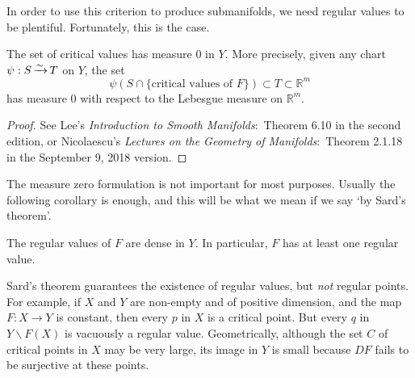 \documentclass[a4paper,11pt]{article}
\begin{document}
	In order to use this criterion to produce submanifolds, we need regular values to be plentiful. Fortunately, this is the case.

	\begin{thm}
		The set of critical values has measure 0 in $Y$. More precisely, given any chart $\psi: S \operatorname{\xrightarrow{\sim}} T$ on $Y$, the set
		\[
			\psi(S \cap \{\text{critical values of }F\}) \subset T \subset \mathbb{R}^m
		\]
		has measure 0 with respect to the Lebesgue measure on $\mathbb{R}^m$.
	\end{thm}
	\begin{proof}
		See Lee's \emph{Introduction to Smooth Manifolds}:\ Theorem 6.10 in the second edition, or Nicolaescu's \emph{Lectures on the Geometry of Manifolds}:\ Theorem 2.1.18 in the September 9, 2018 version.
	\end{proof}

	The measure zero formulation is not important for most purposes. Usually the following corollary is enough, and this will be what we mean if we say `by Sard's theorem'.

	\begin{cor}
		The regular values of $F$ are dense in $Y$. In particular, $F$ has at least one regular value.
	\end{cor}

	\begin{rmk}
		Sard's theorem guarantees the existence of regular values, but \emph{not} regular points. For example, if $X$ and $Y$ are non-empty and of positive dimension, and the map $F: X \to Y$ is constant, then every $p$ in $X$ is a critical point. But every $q$ in $Y \backslash F(X)$ is vacuously a regular value. Geometrically, although the set $C$ of critical points in $X$ may be very large, its image in $Y$ is small because $DF$ fails to be surjective at these points.
	\end{rmk}
\end{document}
